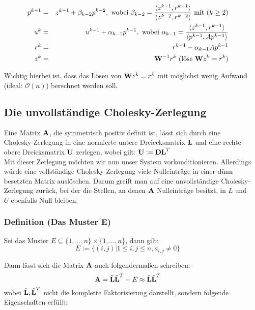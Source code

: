 \begin{eqnarray}
p^{k-1} &=& z^{k-1} + \beta_{k-2}p^{k-2}, \textnormal{ wobei } \beta_{k-2} = \frac {\langle z^{k-1}, r^{k-1} \rangle} {\langle z^{k-2}, r^{k-2} \rangle} \textnormal{ mit } (k \ge 2) \notag \\
u^{k} &=& u^{k-1} + \alpha_{k-1}p^{k-1}, \textnormal{ wobei } \alpha_{k-1} = \frac {\langle z^{k-1}, r^{k-1} \rangle} {\langle p^{k-1}, Ap^{k-1} \rangle} \notag \\
r^{k} &=& r^{k-1} - \alpha_{k-1}Ap^{k-1} \notag \\
z^{k} &=& {\textbf{W}}^{-1}r^{k} \textnormal{ (löse } {\textbf{W}}z^{k} = r^{k}) \notag
\end{eqnarray}

Wichtig hierbei ist, dass das Lösen von ${\textbf{W}}z^{k} = r^{k}$ mit möglichst wenig Aufwand (ideal: $\mathcal{O}(n)$) berechnet werden soll.

\subsection{Die unvollständige Cholesky-Zerlegung}\label{ss.ICCG}

Eine Matrix ${\textbf{A}}$, die symmetrisch positiv definit ist, lässt sich durch eine Cholesky-Zerlegung in eine normierte untere Dreiecksmatrix ${\textbf{L}}$ und eine rechte obere Dreicksmatrix ${\textbf{U}}$ zerlegen, wobei gilt: ${\textbf{U}} := {\textbf{D}}{\textbf{L}}^{T}$ \\
Mit dieser Zerlegung möchten wir nun unser System vorkonditionieren. Allerdings würde eine vollständige Cholesky-Zerlegung viele Nulleinträge in einer dünn besetzten Matrix auslöschen. Darum greift man auf eine unvollständige Cholesky-Zerlegung zurück, bei der die Stellen, an denen ${\textbf{A}}$ Nulleinträge besitzt, in $L$ und $U$ ebenfalls Null bleiben.

\subsubsection{Definition (Das Muster E)}\label{sss.Muster E}

Sei das Muster $E \subseteq \{1,...,n\} \times \{1,...,n\}$, dann gilt:
\begin{equation}
E := \{(i,j) | 1 \le i,j \le n, a_{i,j} \ne 0 \}
\end{equation}

Dann lässt sich die Matrix ${\textbf{A}}$ auch folgendermaßen schreiben:
\begin{equation}
{\textbf{A}} = \tilde{{\textbf{L}}} \tilde{{\textbf{L}}}^{T} + E \approx \tilde{{\textbf{L}}} \tilde{{\textbf{L}}}^{T}
\end{equation}
wobei $\tilde{{\textbf{L}}}, \tilde{{\textbf{L}}}^{T}$ nicht die komplette Faktorisierung darstellt, sondern folgende Eigenschaften erfüllt:

